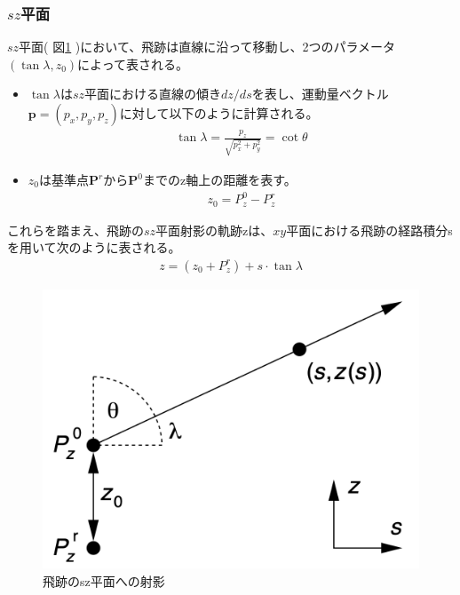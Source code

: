 \subsubsection{$sz$平面}
$sz$平面( 図\ref{sz} )において、飛跡は直線に沿って移動し、2つのパラメータ$(\tan \lambda, z_0)$によって表される。
\begin{itemize}
\item $\tan \lambda$は$sz$平面における直線の傾き$dz/ds$を表し、運動量ベクトル $\mathbf{p} = \left( p_x, p_y, p_z \right)$に対して以下のように計算される。
\begin{align}
\tan \lambda =\frac{p_z}{\sqrt{p_x^2 + p_y^2}} = \cot \theta
\end{align}
\item $z_0$は基準点$\mathbf{P}^r$から$\mathbf{P}^0$までのz軸上の距離を表す。\\
\begin{align}
z_0 = P_z^0 - P_z^r
\end{align}
\end{itemize}
これらを踏まえ、飛跡の$sz$平面射影の軌跡zは、$xy$平面における飛跡の経路積分sを用いて次のように表される。
\begin{align}
z = ( z_0 + P_z^r) + s \cdot \tan \lambda
\end{align}
\begin{figure}[H]
	\begin{center}
 \includegraphics[keepaspectratio, scale=0.4]
 	{Figure/Appendix/sz.png}
 		\caption{飛跡のsz平面への射影}
 		\label{sz}
	\end{center}
\end{figure}
